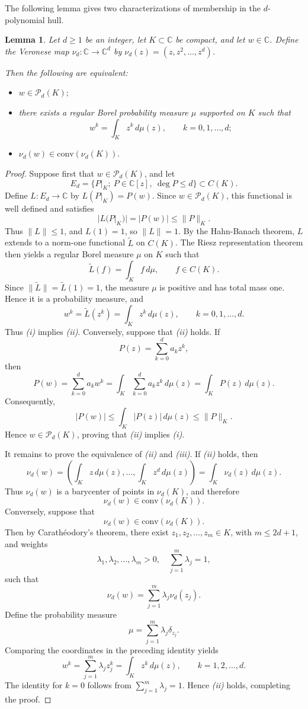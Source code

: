 \documentclass[10pt,a4paper]{amsart}
\newtheorem{lemma}[theorem]{Lemma}
\newcommand{\C}{\mathbb{C}}
\newcommand{\Conv}{{\mathrm{conv}}}
\newcommand{\cP}{\mathcal{P}}
\numberwithin{equation}{section}
\begin{document}
The following lemma gives two characterizations of membership in the $d$-polynomial hull.
\begin{lemma}\label{L}  Let $d\ge 1$ be an integer, let $K\subset\mathbb{C}$ be compact, and let $w\in\C$. Define the Veronese map $\nu_d:\C\to\C^d$ by $\nu_d(z)=(z,z^2,\ldots,z^d)$. 

Then the following are equivalent:
\begin{itemize}
\item[(i)] $w\in\cP_d(K);$
\item[(ii)] there exists a regular Borel probability measure $\mu$ supported on $K$ such that
\[w^k=\int_K z^k\,d\mu(z),\qquad k=0,1,\ldots,d;\]	
\item[(iii)] $\nu_d(w)\in\Conv(\nu_d(K)).$ 
\end{itemize}
\end{lemma}
\begin{proof}
Suppose first that $w\in\cP_d(K)$, and let 
\[E_d=\{P|_K;\ P\in\C[z],\ \deg P\le d\}\subset C(K).\]
Define $L:E_d\to\C$ by $L(P|_K)=P(w)$. Since $w\in\cP_d(K)$, this functional is well defined and satisfies
\[|L(P|_K)|=|P(w)|\le \|P\|_K.\]
Thus $\|L\|\le 1$, and $L(1)=1$, so $\|L\|=1$. By the Hahn-Banach theorem, $L$ extends to a norm-one functional $\tilde L$ on $C(K)$. The Riesz representation theorem then yields a regular Borel measure $\mu$ on $K$ such that
\[\tilde L(f)=\int_K f\,d\mu,\qquad f\in C(K).\]
Since $\|\tilde L\|=\tilde L(1)=1$, the measure $\mu$ is positive and has total mass one. Hence it is a probability measure, and
\[w^k=\tilde L(z^k)=\int_K z^k\,d\mu(z),\qquad k=0,1,\ldots,d.\]
Thus \emph{(i)} implies \emph{(ii)}.
Conversely, suppose that \emph{(ii)} holds. If
\[P(z)=\sum_{k=0}^d a_kz^k,\]
then
\[P(w)=\sum_{k=0}^d a_kw^k=\int_K\sum_{k=0}^d a_kz^k\,d\mu(z)
=\int_K P(z)\,d\mu(z).
\]
Consequently,
\[|P(w)|\le \int_K |P(z)|\,d\mu(z)\le \|P\|_K.\]
Hence $w\in\cP_d(K)$, proving that \emph{(ii)} implies
\emph{(i)}.

It remains to prove the equivalence of \emph{(ii)} and \emph{(iii)}.
If \emph{(ii)} holds, then
\[\nu_d(w)
=\left(\int_Kz\,d\mu(z),\ldots,\int_Kz^d\,d\mu(z)\right)=
\int_K \nu_d(z)\,d\mu(z).
\]
Thus $\nu_d(w)$ is a barycenter of points in $\nu_d(K)$, and therefore
\[\nu_d(w)\in\Conv(\nu_d(K)).\]
Conversely, suppose that
\[\nu_d(w)\in\Conv(\nu_d(K)).\]
Then by Carath\'eodory's theorem, there exist $z_1,z_2,\ldots,z_m\in K$, with $m\le 2d+1$, and weights
\[\lambda_1,\lambda_2,\ldots,\lambda_m>0,\quad \sum_{j=1}^m \lambda_j=1,\] 
such that
\[\nu_d(w)=\sum_{j=1}^m \lambda_j\nu_d(z_j).
\]
Define the probability measure
\[\mu=\sum_{j=1}^m \lambda_j\delta_{z_j}.\]
Comparing the coordinates in the preceding identity yields
\[w^k=\sum_{j=1}^m \lambda_jz_j^k=\int_Kz^k\,d\mu(z),
\qquad k=1,2,\ldots,d.
\]
The identity for $k=0$ follows from
$\sum_{j=1}^m\lambda_j=1$. Hence \emph{(ii)} holds, completing the proof.
\end{proof}
\end{document}
